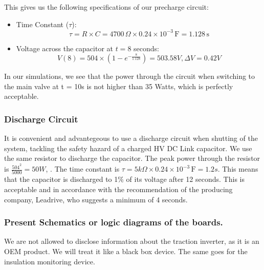 This gives us the following specifications of our precharge circuit:
\begin{itemize}
\item Time Constant (\( \tau \)):
\[ \tau = R \times C = 4700 \, \Omega \times 0.24 \times 10^{-3} \, \text{F} = 1.128 \, \text{s} \]

\item Voltage across the capacitor at \( t = 8 \) seconds:
\[ V(8) = 504 \times \left(1 - e^{-\frac{8}{1.128}}\right) = 503.58V, \Delta V = 0.42V \]
\end{itemize}
In our simulations, we see that the power through the circuit when switching to the main valve at t = 10s is not higher than 35 Watts, which is perfectly acceptable.

\subsubsection*{Discharge Circuit}
It is convenient and advantegeous to use a discharge circuit when shutting of the system, tackling the safety hazard of a charged HV DC Link capacitor. We use the same resistor to discharge the capacitor. The peak power through the resistor is \( \frac{504^2}{5000} = 50W \), . The time constant is \( \tau = 5k \Omega \times 0.24 \times 10^{-3} \, \text{F} = 1.2s \). This means that the capacitor is discharged to 1\% of its voltage after 12 seconds. This is acceptable and in accordance with the recommendation of the producing company, Leadrive, who suggests a minimum of 4 seconds.

\subsubsection{Present Schematics or logic diagrams of the boards.}

We are not allowed to disclose information about the traction inverter, as it is an OEM product. We will treat it like a black box device. 
The same goes for the insulation monitoring device.
